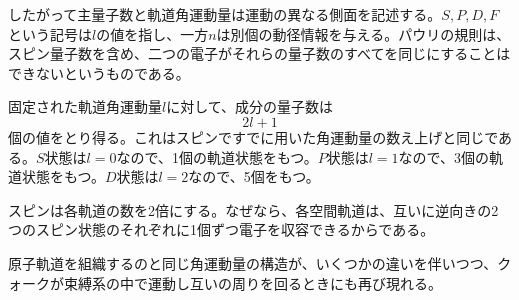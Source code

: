 したがって主量子数と軌道角運動量は運動の異なる側面を記述する。\(S,P,D,F\)という記号は\(l\)の値を指し、一方\(n\)は別個の動径情報を与える。パウリの規則は、スピン量子数を含め、二つの電子がそれらの量子数のすべてを同じにすることはできないというものである。

\begin{classroomqa}
\end{classroomqa}

固定された軌道角運動量\(l\)に対して、成分の量子数は
\begin{equation}
2l+1
\end{equation}
個の値をとり得る。これはスピンですでに用いた角運動量の数え上げと同じである。\(S\)状態は\(l=0\)なので、1個の軌道状態をもつ。\(P\)状態は\(l=1\)なので、3個の軌道状態をもつ。\(D\)状態は\(l=2\)なので、5個をもつ。

スピンは各軌道の数を2倍にする。なぜなら、各空間軌道は、互いに逆向きの2つのスピン状態のそれぞれに1個ずつ電子を収容できるからである。

\begin{classroomqa}
\end{classroomqa}

原子軌道を組織するのと同じ角運動量の構造が、いくつかの違いを伴いつつ、クォークが束縛系の中で運動し互いの周りを回るときにも再び現れる。
